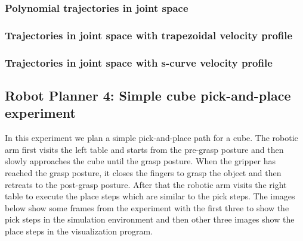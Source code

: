 \subsubsection{Polynomial trajectories in joint space}

\subsubsection{Trajectories in joint space with trapezoidal velocity profile}

\subsubsection{Trajectories in joint space with s-curve velocity profile}

\subsection{Robot Planner 4: Simple cube pick-and-place experiment}

In this experiment we plan a simple pick-and-place path for a cube. The robotic arm first visits the left table and starts from the pre-grasp posture and then 
slowly approaches the cube until the grasp posture. When the gripper has reached the grasp posture, it closes the fingers to grasp the object and then retreats 
to the post-grasp posture. After that the robotic arm visits the right table to execute the place steps which are similar to the pick steps. The images below 
show some frames from the experiment with the first three to show the pick steps in the simulation environment and then other three images show the place steps 
in the visualization program.

